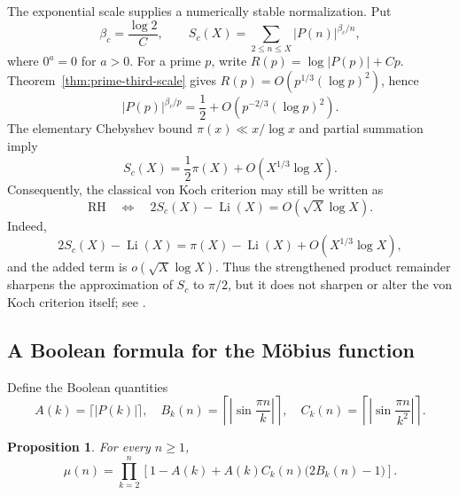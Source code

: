 \documentclass[11pt]{amsart}
\numberwithin{equation}{section}
\newtheorem{proposition}[theorem]{Proposition}
\theoremstyle{definition}
\theoremstyle{remark}
\newcommand{\Li}{\operatorname{Li}}
\begin{document}
The exponential scale supplies a numerically stable normalization.  Put
\begin{equation}\label{eq:critical-beta}
 \beta_c=\frac{\log2}{C},
 \qquad
 S_c(X)=\sum_{2\leq n\leq X}|P(n)|^{\beta_c/n},
\end{equation}
where \(0^a=0\) for \(a>0\).  For a prime \(p\), write
\(R(p)=\log|P(p)|+Cp\).  Theorem~\ref{thm:prime-third-scale} gives
\(R(p)=O(p^{1/3}(\log p)^2)\), hence
\begin{equation}\label{eq:critical-weight}
 |P(p)|^{\beta_c/p}
 =\frac12+O\!\left(p^{-2/3}(\log p)^2\right).
\end{equation}
The elementary Chebyshev bound \(\pi(x)\ll x/\log x\) and partial
summation imply
\begin{equation}\label{eq:normalized-count}
 S_c(X)=\frac12\pi(X)+O(X^{1/3}\log X).
\end{equation}
Consequently, the classical von Koch criterion may still be written as
\begin{equation}\label{eq:RH-normalized-count}
 \mathrm{RH}\quad\Longleftrightarrow\quad
 2S_c(X)-\Li(X)=O(\sqrt X\log X).
\end{equation}
Indeed,
\begin{equation}\label{eq:RH-normalized-difference}
 2S_c(X)-\Li(X)
 =\pi(X)-\Li(X)+O(X^{1/3}\log X),
\end{equation}
and the added term is \(o(\sqrt X\log X)\).  Thus the strengthened
product remainder sharpens the approximation of \(S_c\) to \(\pi/2\), but
it does not sharpen or alter the von Koch criterion itself; see
\cite[Chapter~XIV]{TitchmarshHeathBrown1986}.

\subsection{A Boolean formula for the M\"obius function}

Define the Boolean quantities
\begin{equation}\label{eq:ABC}
 A(k)=\lceil|P(k)|\rceil,
 \quad
 B_k(n)=\left\lceil\left|\sin\frac{\pi n}{k}\right|\right\rceil,
 \quad
 C_k(n)=\left\lceil\left|\sin\frac{\pi n}{k^2}\right|\right\rceil.
\end{equation}

\begin{proposition}\label{prop:mobius-boolean}
For every \(n\geq1\),
\begin{equation}\label{eq:mobius-boolean}
 \mu(n)=\prod_{k=2}^{n}
 \left[1-A(k)+A(k)C_k(n)\bigl(2B_k(n)-1\bigr)\right].
\end{equation}
\end{proposition}
\end{document}
